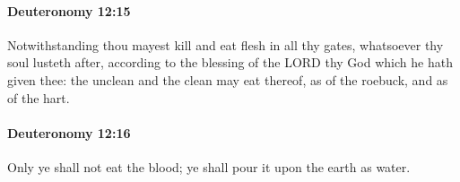 		\paragraph{Deuteronomy 12:15} %
			\label{DEUTERONOMY-12-15}

			Notwithstanding thou mayest kill and eat flesh in all thy gates, whatsoever thy soul lusteth after, according to the blessing of the LORD thy God which he hath given thee: the unclean and the clean may eat thereof, as of the roebuck, and as of the hart.


		\paragraph{Deuteronomy 12:16} %
			\label{DEUTERONOMY-12-16}

			Only ye shall not eat the blood; ye shall pour it upon the earth as water.


